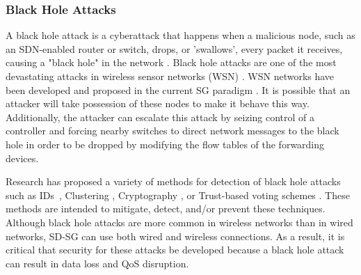 \documentclass[conference]{IEEEtran}
\begin{document}
    
\subsubsection{Black Hole Attacks} A black hole attack is a cyberattack that happens when a malicious node, such as an SDN-enabled router or switch, drops, or 'swallows', every packet it receives, causing a "black hole" in the network \cite{hsieh2018detection, gurung2020survey}. Black hole attacks are one of the most devastating attacks in wireless sensor networks (WSN) \cite{kalkha2019preventing}. WSN networks have been developed and proposed in the current SG paradigm \cite{abujubbeh2019software}.  It is possible that an attacker will take possession of these nodes to make it behave this way. Additionally, the attacker can escalate this attack by seizing control of a controller and forcing nearby switches to direct network messages to the black hole in order to be dropped by modifying the flow tables of the forwarding devices.

Research has proposed a variety of methods for detection of black hole attacks such as IDs~\cite{gruebler2015intrusion, gite2021ml}, Clustering \cite{shi2014cluster, katal2013cluster}, Cryptography \cite{shukla2021mitigate, kumar2021black}, or Trust-based voting schemes \cite{keerthika2019mitigate,naveena2020analysis}. These methods are intended to mitigate, detect, and/or prevent these techniques. Although black hole attacks are more common in wireless networks than in wired networks, SD-SG can use both wired and wireless connections. As a result, it is critical that security for these attacks be developed because a black hole attack can result in data loss and QoS disruption.  
\end{document}
